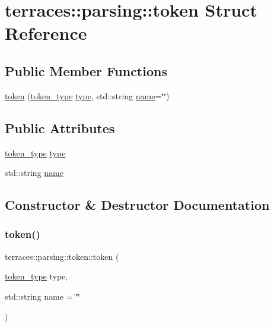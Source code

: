 \hypertarget{structterraces_1_1parsing_1_1token}{}\section{terraces\+:\+:parsing\+:\+:token Struct Reference}
\label{structterraces_1_1parsing_1_1token}
\subsection*{Public Member Functions}
\begin{DoxyCompactItemize}
\item 
\hyperlink{structterraces_1_1parsing_1_1token_a0ae01557b760ab7728d2a2822baeed5a}{token} (\hyperlink{namespaceterraces_1_1parsing_a2d265240dc54342f9462104d7a8392a1}{token\+\_\+type} \hyperlink{structterraces_1_1parsing_1_1token_a693232d0e7f4657065cd86b289be10fc}{type}, std\+::string \hyperlink{structterraces_1_1parsing_1_1token_a58acae611947cb71644268d10d7f12fb}{name}=\char`\"{}\char`\"{})
\end{DoxyCompactItemize}
\subsection*{Public Attributes}
\begin{DoxyCompactItemize}
\item 
\hyperlink{namespaceterraces_1_1parsing_a2d265240dc54342f9462104d7a8392a1}{token\+\_\+type} \hyperlink{structterraces_1_1parsing_1_1token_a693232d0e7f4657065cd86b289be10fc}{type}
\item 
std\+::string \hyperlink{structterraces_1_1parsing_1_1token_a58acae611947cb71644268d10d7f12fb}{name}
\end{DoxyCompactItemize}


\subsection{Constructor \& Destructor Documentation}
\mbox{\label{structterraces_1_1parsing_1_1token_a0ae01557b760ab7728d2a2822baeed5a}} 
\subsubsection{\texorpdfstring{token()}{token()}}
{\footnotesize\ttfamily terraces\+::parsing\+::token\+::token (\begin{DoxyParamCaption}\item[{\hyperlink{namespaceterraces_1_1parsing_a2d265240dc54342f9462104d7a8392a1}{token\+\_\+type}}]{type,  }\item[{std\+::string}]{name = {\ttfamily \char`\"{}\char`\"{}} }\end{DoxyParamCaption})\hspace{0.3cm}{\ttfamily [inline]}}



